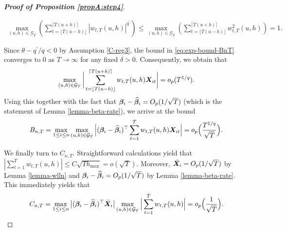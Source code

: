 \begin{proof}[\textnormal{\textbf{Proof of Proposition \ref{propA:step4}}}]
\begin{enumerate}[label=(\roman*),leftmargin=0.85cm]
\begin{align*}
\max_{(u, h) \in \mathcal{G}_T} \left( \sum_{t=\lfloor T(u-h) \rfloor}^{\lceil T(u+h) \rceil} |w_{t,T}(u,h)|^{q^\prime}\right) \leq
\max_{(u, h) \in \mathcal{G}_T} \left( \sum_{t=\lfloor T(u-h) \rfloor}^{\lceil T(u+h) \rceil} w_{t,T}^2(u,h)\right) =1.
\end{align*}
\end{enumerate}
Since $\theta - q^\prime/q <0$ by Assumption \ref{C-reg3}, the bound in \eqref{eq:exp-bound-BnT} converges to $0$ as $T \to \infty$ for any fixed $\delta >0$. Consequently, we obtain that
\begin{align}\label{ineq-diff-9}
\max_{(u, h) \in \mathcal{G}_T} \bigg| \sum_{t=\lfloor T(u-h) \rfloor}^{\lceil T(u+h) \rceil} w_{t,T}(u,h)\boldsymbol{X}_{it}  \bigg| = o_p(T^{1/q}).
\end{align}
Using this together with the fact that $\bm{\beta}_i - \widehat{\bm{\beta}}_i = O_p(1/\sqrt{T})$ (which is the statement of Lemma \ref{lemma-beta-rate}), we arrive at the bound 
\[ B_{n,T} = \max_{1 \le i \le n} \max_{(u,h) \in \mathcal{G}_T} \Big| (\bm{\beta}_i - \widehat{\bm{\beta}}_i)^\top\sum_{t=1}^T w_{t,T}(u,h) \boldsymbol{X}_{it} \Big| = o_p\Big(\frac{T^{1/q}}{\sqrt{T}}\Big). \]


We finally turn to $C_{n,T}$. Straightforward calculations yield that $| \sum_{t=1}^T w_{t,T}(u,h) | \le C \sqrt{T h_{\max}} = o(\sqrt{T})$. 
Moreover, $\bar{\boldsymbol{X}}_i = O_p(1/\sqrt{T})$ by Lemma \ref{lemma-wlln} and $\bm{\beta}_i - \widehat{\bm{\beta}}_i = O_p(1/\sqrt{T})$ by Lemma \ref{lemma-beta-rate}. This immediately yields that
\[ C_{n,T} = \max_{1\le i  \le n}\big|(\bm{\beta}_i - \widehat{\bm{\beta}}_i)^\top\bar{\boldsymbol{X}}_{i}\big| \max_{(u,h) \in \mathcal{G}_T}  \Big| \sum_{t=1}^T w_{t,T}(u,h)  \Big| = o_p\Big(\frac{1}{\sqrt{T}}\Big). \]



\end{proof}
